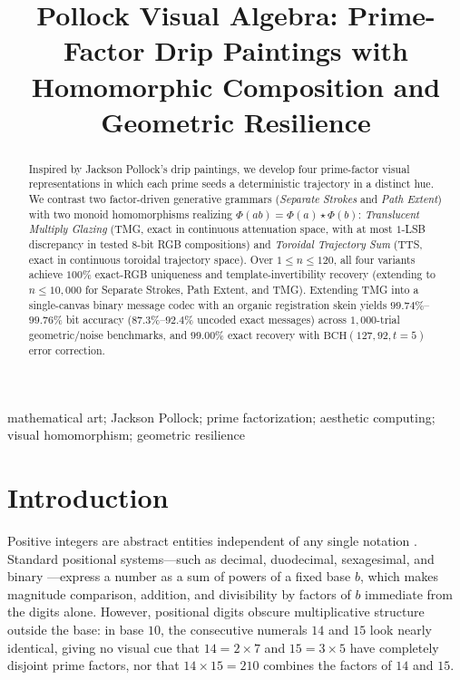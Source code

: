 \documentclass[]{interact}
\theoremstyle{plain}
\theoremstyle{definition}
\theoremstyle{remark}
\begin{document}

\title{Pollock Visual Algebra: Prime-Factor Drip Paintings with Homomorphic Composition and Geometric Resilience}

\author{
}

\maketitle

\begin{abstract}
Inspired by Jackson Pollock's drip paintings, we develop four prime-factor visual representations in which each prime seeds a deterministic trajectory in a distinct hue. We contrast two factor-driven generative grammars (\emph{Separate Strokes} and \emph{Path Extent}) with two monoid homomorphisms realizing $\Phi(ab) = \Phi(a) \star \Phi(b)$: \emph{Translucent Multiply Glazing} (TMG, exact in continuous attenuation space, with at most $1$-LSB discrepancy in tested 8-bit RGB compositions) and \emph{Toroidal Trajectory Sum} (TTS, exact in continuous toroidal trajectory space). Over $1 \le n \le 120$, all four variants achieve $100\%$ exact-RGB uniqueness and template-invertibility recovery (extending to $n \le 10{,}000$ for Separate Strokes, Path Extent, and TMG). Extending TMG into a single-canvas binary message codec with an organic registration skein yields $99.74\%$--$99.76\%$ bit accuracy ($87.3\%$--$92.4\%$ uncoded exact messages) across $1{,}000$-trial geometric/noise benchmarks, and $99.00\%$ exact recovery with $\mathrm{BCH}(127,92,t=5)$ error correction.
\end{abstract}

\begin{keywords}
mathematical art; Jackson Pollock; prime factorization; aesthetic computing; visual homomorphism; geometric resilience
\end{keywords}

\section{Introduction}
Positive integers are abstract entities independent of any single notation \citep{menninger1969number,reimann2024visual}. Standard positional systems—such as decimal, duodecimal, sexagesimal, and binary \citep{ifrah2000universal,menninger1969number}—express a number as a sum of powers of a fixed base $b$, which makes magnitude comparison, addition, and divisibility by factors of $b$ immediate from the digits alone. However, positional digits obscure multiplicative structure outside the base: in base $10$, the consecutive numerals $14$ and $15$ look nearly identical, giving no visual cue that $14 = 2 \times 7$ and $15 = 3 \times 5$ have completely disjoint prime factors, nor that $14 \times 15 = 210$ combines the factors of $14$ and $15$.
\end{document}
